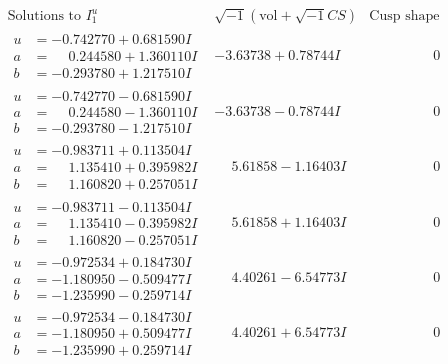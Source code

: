 \documentclass[1p]{elsarticle_modified}
\theoremstyle{definition}
\newcommand{\I}{\sqrt{-1}}
\begin{document}
$$\begin{array}{c|c|c}  
\text{Solutions to }I^u_{1}& \I (\text{vol} + \sqrt{-1}CS) & \text{Cusp shape}\\
 \hline 
\begin{aligned}
u &= -0.742770 + 0.681590 I \\
a &= \phantom{-}0.244580 + 1.360110 I \\
b &= -0.293780 + 1.217510 I\end{aligned}
 & -3.63738 + 0.78744 I & \phantom{-0.000000 } 0 \\ \hline\begin{aligned}
u &= -0.742770 - 0.681590 I \\
a &= \phantom{-}0.244580 - 1.360110 I \\
b &= -0.293780 - 1.217510 I\end{aligned}
 & -3.63738 - 0.78744 I & \phantom{-0.000000 } 0 \\ \hline\begin{aligned}
u &= -0.983711 + 0.113504 I \\
a &= \phantom{-}1.135410 + 0.395982 I \\
b &= \phantom{-}1.160820 + 0.257051 I\end{aligned}
 & \phantom{-}5.61858 - 1.16403 I & \phantom{-0.000000 } 0 \\ \hline\begin{aligned}
u &= -0.983711 - 0.113504 I \\
a &= \phantom{-}1.135410 - 0.395982 I \\
b &= \phantom{-}1.160820 - 0.257051 I\end{aligned}
 & \phantom{-}5.61858 + 1.16403 I & \phantom{-0.000000 } 0 \\ \hline\begin{aligned}
u &= -0.972534 + 0.184730 I \\
a &= -1.180950 - 0.509477 I \\
b &= -1.235990 - 0.259714 I\end{aligned}
 & \phantom{-}4.40261 - 6.54773 I & \phantom{-0.000000 } 0 \\ \hline\begin{aligned}
u &= -0.972534 - 0.184730 I \\
a &= -1.180950 + 0.509477 I \\
b &= -1.235990 + 0.259714 I\end{aligned}
 & \phantom{-}4.40261 + 6.54773 I & \phantom{-0.000000 } 0 \\ \hline\begin{aligned}

\end{aligned}
\end{array}$$
\end{document}
